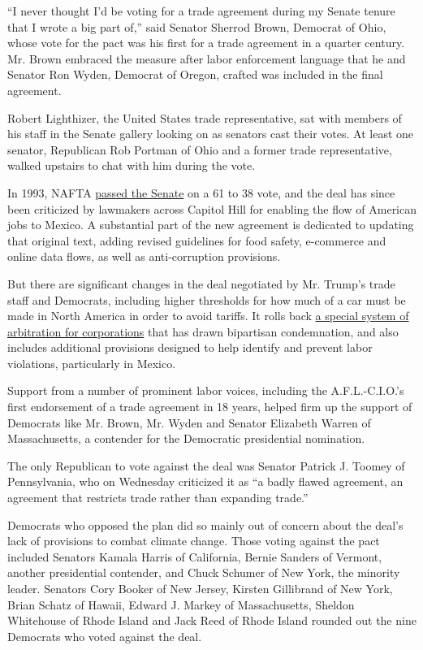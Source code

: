 ``I never thought I'd be voting for a trade agreement during my Senate
tenure that I wrote a big part of,'' said Senator Sherrod Brown,
Democrat of Ohio, whose vote for the pact was his first for a trade
agreement in a quarter century. Mr. Brown embraced the measure after
labor enforcement language that he and Senator Ron Wyden, Democrat of
Oregon, crafted was included in the final agreement.

Robert Lighthizer, the United States trade representative, sat with
members of his staff in the Senate gallery looking on as senators cast
their votes. At least one senator, Republican Rob Portman of Ohio and a
former trade representative, walked upstairs to chat with him during the
vote.

In 1993, NAFTA
\href{https://www.nytimes3xbfgragh.onion/1993/11/21/us/senate-roll-call-on-trade-pact.html}{passed
the Senate} on a 61 to 38 vote, and the deal has since been criticized
by lawmakers across Capitol Hill for enabling the flow of American jobs
to Mexico. A substantial part of the new agreement is dedicated to
updating that original text, adding revised guidelines for food safety,
e-commerce and online data flows, as well as anti-corruption provisions.

But there are significant changes in the deal negotiated by Mr. Trump's
trade staff and Democrats, including higher thresholds for how much of a
car must be made in North America in order to avoid tariffs. It rolls
back
\href{https://www.nytimes3xbfgragh.onion/2017/10/16/us/politics/nafta-united-states-canada.html}{a
special system of arbitration for corporations} that has drawn
bipartisan condemnation, and also includes additional provisions
designed to help identify and prevent labor violations, particularly in
Mexico.

Support from a number of prominent labor voices, including the
A.F.L.-C.I.O.'s first endorsement of a trade agreement in 18 years,
helped firm up the support of Democrats like Mr. Brown, Mr. Wyden and
Senator Elizabeth Warren of Massachusetts, a contender for the
Democratic presidential nomination.

The only Republican to vote against the deal was Senator Patrick J.
Toomey of Pennsylvania, who on Wednesday criticized it as ``a badly
flawed agreement, an agreement that restricts trade rather than
expanding trade.''

Democrats who opposed the plan did so mainly out of concern about the
deal's lack of provisions to combat climate change. Those voting against
the pact included Senators Kamala Harris of California, Bernie Sanders
of Vermont, another presidential contender, and Chuck Schumer of New
York, the minority leader. Senators Cory Booker of New Jersey, Kirsten
Gillibrand of New York, Brian Schatz of Hawaii, Edward J. Markey of
Massachusetts, Sheldon Whitehouse of Rhode Island and Jack Reed of Rhode
Island rounded out the nine Democrats who voted against the deal.

